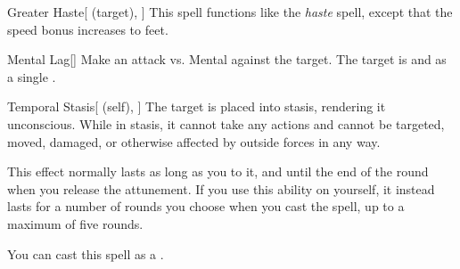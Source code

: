 \lowercase{\hypertarget{spell:Greater Haste}{}}\label{spell:Greater Haste}
\begin{attuneability}[Rank 4]{\hypertarget{spell:Greater Haste}{Greater Haste}}[ (target), ]
This spell functions like the \textit{haste} spell, except that the speed bonus increases to  feet.
\end{attuneability}
\vspace{0.25em}



\lowercase{\hypertarget{spell:Mental Lag}{}}\label{spell:Mental Lag}
\begin{freeability}[Rank 4]{\hypertarget{spell:Mental Lag}{Mental Lag}}[]
Make an attack vs. Mental against the target.
\hit The target is  and  as a single .
\end{freeability}
\vspace{0.25em}



\lowercase{\hypertarget{spell:Temporal Stasis}{}}\label{spell:Temporal Stasis}
\begin{attuneability}[Rank 4]{\hypertarget{spell:Temporal Stasis}{Temporal Stasis}}[ (self), ]
The target is placed into stasis, rendering it unconscious.
While in stasis, it cannot take any actions and cannot be targeted, moved, damaged, or otherwise affected by outside forces in any way.

This effect normally lasts as long as you  to it, and until the end of the round when you release the attunement.
If you use this ability on yourself, it instead lasts for a number of rounds you choose when you cast the spell, up to a maximum of five rounds.

You can cast this spell as a .
\end{attuneability}
\vspace{0.25em}



